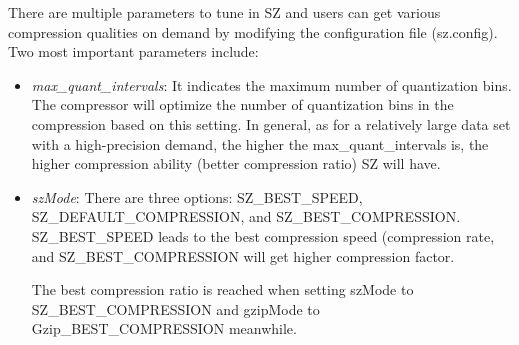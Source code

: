 There are multiple parameters to tune in SZ and users can get various compression qualities on demand by modifying the configuration file (sz.config). Two most important parameters include:
\begin{itemize}
\item \emph{max\_quant\_intervals}: It indicates the maximum number of quantization bins. The compressor will optimize the number of quantization bins in the compression based on this setting. In general, as for a relatively large data set with a high-precision demand, the higher the max\_quant\_intervals is, the higher compression ability (better compression ratio) SZ will have. 
\item \emph{szMode}: There are three options: SZ\_BEST\_SPEED, SZ\_DEFAULT\_COMPRESSION, and SZ\_BEST\_COMPRESSION. SZ\_BEST\_SPEED leads to the best compression speed (compression rate, and SZ\_BEST\_COMPRESSION will get higher compression factor.

The best compression ratio is reached when setting szMode to SZ\_BEST\_COMPRESSION and gzipMode to Gzip\_BEST\_COMPRESSION meanwhile. 
\end{itemize}

